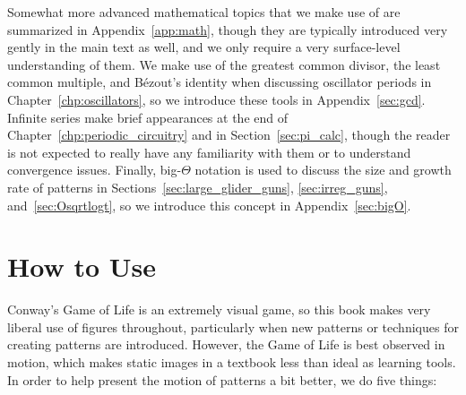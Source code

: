 Somewhat more advanced mathematical topics that we make use of are summarized in Appendix~\ref{app:math}, though they are typically introduced very gently in the main text as well, and we only require a very surface-level understanding of them. We make use of the greatest common divisor, the least common multiple, and B\'ezout's identity when discussing oscillator periods in Chapter~\ref{chp:oscillators}, so we introduce these tools in Appendix~\ref{sec:gcd}. Infinite series make brief appearances at the end of Chapter~\ref{chp:periodic_circuitry} and in Section~\ref{sec:pi_calc}, though the reader is not expected to really have any familiarity with them or to understand convergence issues. Finally, big-$\Theta$ notation is used to discuss the size and growth rate of patterns in Sections~\ref{sec:large_glider_guns}, \ref{sec:irreg_guns}, and~\ref{sec:Osqrtlogt}, so we introduce this concept in Appendix~\ref{sec:bigO}.


\section*{How to Use}

Conway's Game of Life is an extremely visual game, so this book makes very liberal use of figures throughout, particularly when new patterns or techniques for creating patterns are introduced. However, the Game of Life is best observed in motion, which makes static images in a textbook less than ideal as learning tools. In order to help present the motion of patterns a bit better, we do five things:\medskip

